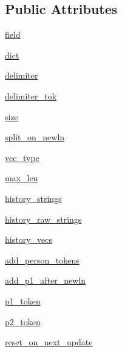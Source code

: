 \subsection*{Public Attributes}
\begin{DoxyCompactItemize}
\item 
\hyperlink{classparlai_1_1core_1_1torch__agent_1_1History_a3481b17d1cd076c5e3ee82178ea7411a}{field}
\item 
\hyperlink{classparlai_1_1core_1_1torch__agent_1_1History_af2dcae73b57a3718cdcb558377a3526b}{dict}
\item 
\hyperlink{classparlai_1_1core_1_1torch__agent_1_1History_ae9e14eb1f34edb914930178e0ecfdb01}{delimiter}
\item 
\hyperlink{classparlai_1_1core_1_1torch__agent_1_1History_a3120b2e6c188316aeffdf1bafbd5baa6}{delimiter\+\_\+tok}
\item 
\hyperlink{classparlai_1_1core_1_1torch__agent_1_1History_a18b6c863146d30b93d15de840566044b}{size}
\item 
\hyperlink{classparlai_1_1core_1_1torch__agent_1_1History_a26d15b60abb195247309c4680657a196}{split\+\_\+on\+\_\+newln}
\item 
\hyperlink{classparlai_1_1core_1_1torch__agent_1_1History_a7e5b6e0372fa48e0e1ba747b5628bfc7}{vec\+\_\+type}
\item 
\hyperlink{classparlai_1_1core_1_1torch__agent_1_1History_acded8e2717f7b9d527076c89a7fbd3f9}{max\+\_\+len}
\item 
\hyperlink{classparlai_1_1core_1_1torch__agent_1_1History_ac2aea76f6a052461e74aa050bb69408a}{history\+\_\+strings}
\item 
\hyperlink{classparlai_1_1core_1_1torch__agent_1_1History_a93643f51a5a2ab0478dff99d571c5f41}{history\+\_\+raw\+\_\+strings}
\item 
\hyperlink{classparlai_1_1core_1_1torch__agent_1_1History_a7d5060a88829f087033ea7ba928ceb1d}{history\+\_\+vecs}
\item 
\hyperlink{classparlai_1_1core_1_1torch__agent_1_1History_a1ceeb7bf9ff2209a9aafff142e667006}{add\+\_\+person\+\_\+tokens}
\item 
\hyperlink{classparlai_1_1core_1_1torch__agent_1_1History_aa0ab2c82ef1ba339dd04eafd57c082e5}{add\+\_\+p1\+\_\+after\+\_\+newln}
\item 
\hyperlink{classparlai_1_1core_1_1torch__agent_1_1History_a7eff0681e0eee4051abb530797f15884}{p1\+\_\+token}
\item 
\hyperlink{classparlai_1_1core_1_1torch__agent_1_1History_ab9f9f10b0dd73d90d3798fb3e1787ee6}{p2\+\_\+token}
\item 
\hyperlink{classparlai_1_1core_1_1torch__agent_1_1History_a191e6a7c5f54aab89875b8a9bc2f3cbd}{reset\+\_\+on\+\_\+next\+\_\+update}
\end{DoxyCompactItemize}


